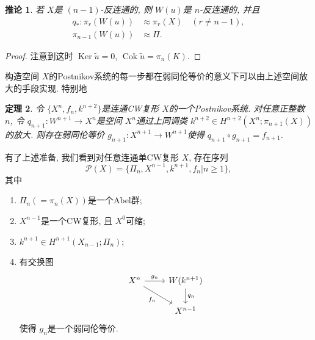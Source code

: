 \documentclass{ctexart}
\theoremstyle{plain}
\newtheorem{theorem}{定理}[section]
\newtheorem{corollary}[theorem]{推论}
\theoremstyle{definition}
\begin{document}
        \begin{corollary}
            \label{cor:amplification of n-1 anticonnected space}
            若 $X$是 $(n-1)$-反连通的, 则 $W(u)$是 $n$-反连通的, 并且
            \begin{equation*}
                \begin{aligned}
                    q_{*}:\pi_{r}(W(u))&\approx\pi_{r}(X)\quad(r\neq n-1),\\
                    \pi_{n-1}(W(u))&\approx\Pi.
                \end{aligned}
            \end{equation*}
        \end{corollary}

        \begin{proof}
            注意到这时 $\operatorname{Ker} \tilde{u}=0$, $\operatorname{Cok}\tilde{u}=\pi_{n}(K)$.
        \end{proof}

        构造空间 $X$的Postnikov系统的每一步都在弱同伦等价的意义下可以由上述空间放大的手段实现. 特别地

        \begin{theorem}
            令 $\{X^{n},f_{n},k^{n+2}\}$是连通CW复形 $X$的一个Postnikov系统. 对任意正整数 $n$, 令 $q_{n+1}:W^{n+1}\to X^{n}$是空间 $X^{n}$通过上同调类 $k^{n+2}\in H^{n+2}(X^{n};\pi_{n+1}(X))$的放大. 则存在弱同伦等价 $g_{n+1}:X^{n+1}\to W^{n+1}$使得 $q_{n+1}\circ g_{n+1}=f_{n+1}$.
        \end{theorem}

        有了上述准备, 我们看到对任意连通单CW复形 $X$, 存在序列 
        \begin{equation*}
            \mathscr{P}(X)=\{\Pi_n, X^{n-1}, k^{n+1},f_n| n\geq1\},
        \end{equation*}
        其中
        \begin{enumerate}
            \item $\Pi_{n}(=\pi_{n}(X))$是一个Abel群;
            \item $X^{n-1}$是一个CW复形, 且 $X^{0}$可缩;
            \item $k^{n+1}\in H^{n+1}(X_{n-1};\Pi_{n})$;
            \item 有交换图 
            \begin{equation*}
              \begin{tikzcd}
                X^{n}\arrow[r, "g_{n}"] \arrow[rd, "f_{n}"'] & W(k^{n+1}) \arrow[d, "q_{n}"] \\
                & X^{n-1}
              \end{tikzcd}
            \end{equation*}
            使得 $g_{n}$是一个弱同伦等价.
        \end{enumerate}
\end{document}
